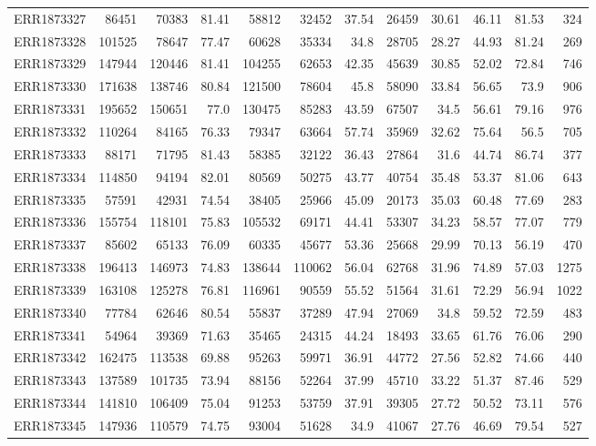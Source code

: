 \documentclass[12pt, oneside]{report}
\begin{document}
\begin{longtable}{@{}p{3.2cm}rrrrrrrrrrr@{}}
ERR1873327 & 86451 & 70383 & 81.41 & 58812 & 32452 & 37.54 & 26459 & 30.61 & 46.11 & 81.53 & 324 \\
ERR1873328 & 101525 & 78647 & 77.47 & 60628 & 35334 & 34.8 & 28705 & 28.27 & 44.93 & 81.24 & 269 \\
ERR1873329 & 147944 & 120446 & 81.41 & 104255 & 62653 & 42.35 & 45639 & 30.85 & 52.02 & 72.84 & 746 \\
ERR1873330 & 171638 & 138746 & 80.84 & 121500 & 78604 & 45.8 & 58090 & 33.84 & 56.65 & 73.9 & 906 \\
ERR1873331 & 195652 & 150651 & 77.0 & 130475 & 85283 & 43.59 & 67507 & 34.5 & 56.61 & 79.16 & 976 \\
ERR1873332 & 110264 & 84165 & 76.33 & 79347 & 63664 & 57.74 & 35969 & 32.62 & 75.64 & 56.5 & 705 \\
ERR1873333 & 88171 & 71795 & 81.43 & 58385 & 32122 & 36.43 & 27864 & 31.6 & 44.74 & 86.74 & 377 \\
ERR1873334 & 114850 & 94194 & 82.01 & 80569 & 50275 & 43.77 & 40754 & 35.48 & 53.37 & 81.06 & 643 \\
ERR1873335 & 57591 & 42931 & 74.54 & 38405 & 25966 & 45.09 & 20173 & 35.03 & 60.48 & 77.69 & 283 \\
ERR1873336 & 155754 & 118101 & 75.83 & 105532 & 69171 & 44.41 & 53307 & 34.23 & 58.57 & 77.07 & 779 \\
ERR1873337 & 85602 & 65133 & 76.09 & 60335 & 45677 & 53.36 & 25668 & 29.99 & 70.13 & 56.19 & 470 \\
ERR1873338 & 196413 & 146973 & 74.83 & 138644 & 110062 & 56.04 & 62768 & 31.96 & 74.89 & 57.03 & 1275 \\
ERR1873339 & 163108 & 125278 & 76.81 & 116961 & 90559 & 55.52 & 51564 & 31.61 & 72.29 & 56.94 & 1022 \\
ERR1873340 & 77784 & 62646 & 80.54 & 55837 & 37289 & 47.94 & 27069 & 34.8 & 59.52 & 72.59 & 483 \\
ERR1873341 & 54964 & 39369 & 71.63 & 35465 & 24315 & 44.24 & 18493 & 33.65 & 61.76 & 76.06 & 290 \\
ERR1873342 & 162475 & 113538 & 69.88 & 95263 & 59971 & 36.91 & 44772 & 27.56 & 52.82 & 74.66 & 440 \\
ERR1873343 & 137589 & 101735 & 73.94 & 88156 & 52264 & 37.99 & 45710 & 33.22 & 51.37 & 87.46 & 529 \\
ERR1873344 & 141810 & 106409 & 75.04 & 91253 & 53759 & 37.91 & 39305 & 27.72 & 50.52 & 73.11 & 576 \\
ERR1873345 & 147936 & 110579 & 74.75 & 93004 & 51628 & 34.9 & 41067 & 27.76 & 46.69 & 79.54 & 527 \\

\end{longtable}
\end{document}
